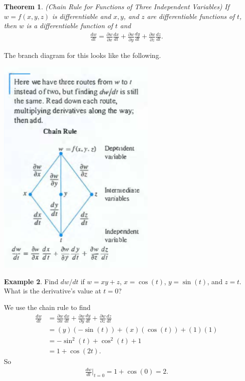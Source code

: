 \documentclass[12pt, letter]{article}
\theoremstyle{plain}
\newtheorem{theorem}{Theorem}
\numberwithin{theorem}{section}
\theoremstyle{definition}
\newtheorem{example}[theorem]{Example}
\begin{document}
\bigskip

\hrulefill

\bigskip

\begin{theorem}{(Chain Rule for Functions of Three Independent Variables)}
If $w=f(x,y,z)$ is differentiable and $x,y$, and $z$ are differentiable functions of $t$, then $w$ is a differentiable function of $t$ and
\begin{align*}
\frac{dw}{dt} = \frac{\partial w}{\partial x} \frac{dx}{dt} + \frac{\partial w}{\partial y} \frac{dy}{dt} + \frac{\partial w}{\partial z} \frac{dz}{dt}.
\end{align*}
\end{theorem}

\bigskip

The branch diagram for this looks like the following.

\bigskip

\begin{center}
\includegraphics[scale=0.7]{m2_f6}
\end{center}

\bigskip

\hrulefill

\bigskip

\begin{example}
Find $dw/dt$ if $w=xy+z$, $x=\cos(t)$, $y=\sin(t)$, and $z=t$. What is the derivative's value at $t=0$?

\smallskip

We use the chain rule to find
\begin{align*}
\frac{dw}{dt} &= \frac{\partial w}{\partial x} \frac{dx}{dt} + \frac{\partial w}{\partial y} \frac{dy}{dt} + \frac{\partial w}{\partial z} \frac{dz}{dt}\\
&= (y)(-\sin(t))+(x)(\cos(t))+(1)(1)\\
&= -\sin^2(t)+\cos^2(t)+1\\
&= 1+\cos(2t).
\end{align*}
So
\begin{align*}
\frac{dw}{dt} \bigg\rvert_{t=0} = 1+\cos(0) = 2.
\end{align*}
\end{example}
\end{document}
